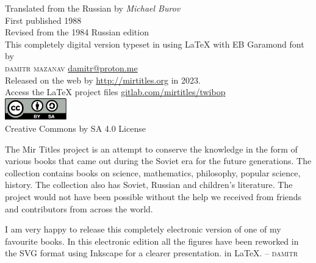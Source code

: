 \noindent
\begin{smaller}

\begin{tcolorbox}{}
Translated from the Russian by \emph{Michael Burov}\\
First published 1988 \\
\noindent
Revised from the 1984 Russian edition \\

This completely digital version typeset in using \LaTeX{} with EB Garamond font by \\
\textsc{damitr mazanav} \url{damitr@proton.me} \\ 
Released on the web by \textcolor{CornflowerBlue}{\url{http://mirtitles.org}} in 2023.\\

Access the \LaTeX{} project files \url{gitlab.com/mirtitles/twibop}\\

\includegraphics[width=0.2\textwidth]{figures/cc-by-sa.pdf}\\

Creative Commons by SA 4.0 License\\
\end{tcolorbox}


\begin{tcolorbox}[title=About Mir Titles Project]

The Mir Titles project is an attempt to conserve the knowledge in the form of various books that came out during the Soviet era for the future generations. The collection contains books on science, mathematics, philosophy, popular science, history. The collection also has Soviet, Russian and children's literature. The project would not have been possible without the help we received from friends and contributors from across the world. 
\end{tcolorbox}


\begin{tcolorbox}[title=Foreword]

I am very happy to release this completely electronic version of one of my favourite books. In this electronic edition all the figures have been reworked in the SVG format using Inkscape for a clearer presentation.  in \LaTeX{}.
-- \textsc{damitr}
\end{tcolorbox}



\setcounter{tocdepth}{3}
\end{smaller}
\cleardoublepage





